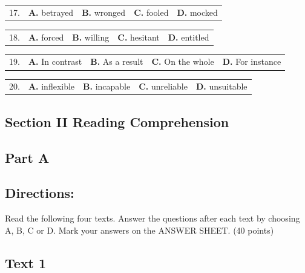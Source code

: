 \documentclass[UTF8,11pt]{ctexart}
\begin{document}
\noindent\begin{tabularx}{\linewidth}{@{}lXXXX@{}}17. & \textbf{A.} betrayed & \textbf{B.} wronged & \textbf{C.} fooled & \textbf{D.} mocked\\\end{tabularx}\par

\noindent\begin{tabularx}{\linewidth}{@{}lXXXX@{}}18. & \textbf{A.} forced & \textbf{B.} willing & \textbf{C.} hesitant & \textbf{D.} entitled\\\end{tabularx}\par

\noindent\begin{tabularx}{\linewidth}{@{}lXXXX@{}}19. & \textbf{A.} In contrast & \textbf{B.} As a result & \textbf{C.} On the whole & \textbf{D.} For instance\\\end{tabularx}\par

\noindent\begin{tabularx}{\linewidth}{@{}lXXXX@{}}20. & \textbf{A.} inflexible & \textbf{B.} incapable & \textbf{C.} unreliable & \textbf{D.} unsuitable\\\end{tabularx}\par

\subsection*{\textbf{Section II Reading Comprehension}}


\subsection*{\textbf{Part A}}


\subsection*{\textbf{Directions:}}


Read the following four texts. Answer the questions after each text by choosing A, B, C or D. Mark your answers on the ANSWER SHEET. (40 points)


\subsection*{\textbf{Text 1}}
\end{document}
